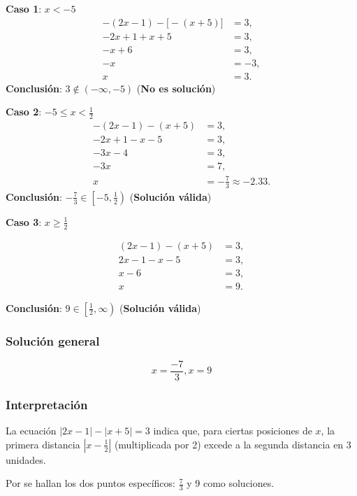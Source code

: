 \textbf{Caso 1}: \(x < -5\)
\begin{align*}
    -(2x-1) - \big[-(x+5)\big] &= 3,\\[1mm]
    -2x+1 + x+5 &= 3,\\[1mm]
    -x+6 &= 3,\\[1mm]
    -x &= -3,\\[1mm]
    x &= 3.
\end{align*}
\textbf{Conclusión}: \(3 \notin (-\infty,-5)\) \quad (\textbf{No es solución})

\textbf{Caso 2}: \(-5 \leq x < \frac{1}{2}\)
\begin{align*}
    -(2x-1) - (x+5) &= 3,\\[1mm]
    -2x+1 - x-5 &= 3,\\[1mm]
    -3x-4 &= 3,\\[1mm]
    -3x &= 7,\\[1mm]
    x &= -\frac{7}{3} \approx -2.33.
\end{align*}
\textbf{Conclusión}: \(-\frac{7}{3} \in \left[-5, \frac{1}{2}\right)\) \quad (\textbf{Solución válida})

\textbf{Caso 3}: \(x \geq \frac{1}{2}\)

\begin{align*}
    (2x-1) - (x+5) &= 3,\\[1mm]
    2x-1 - x-5 &= 3,\\[1mm]
    x-6 &= 3,\\[1mm]
    x &= 9.
\end{align*}

\textbf{Conclusión}: \(9 \in \left[\frac{1}{2}, \infty\right)\) \quad (\textbf{Solución válida})\\
\subsubsection*{Solución general}
\begin{equation*}
    x = \frac{-7}{3} , x = 9
\end{equation*}

\subsubsection*{Interpretación}

La ecuación \(|2x - 1| - |x + 5| = 3\) indica que, para ciertas posiciones de \(x\), la primera distancia $|x-\frac{1}{2}|$ (multiplicada por 2) excede a la segunda distancia en 3 unidades.

Por se hallan los dos puntos específicos: \(\frac{7}{3}\) y $9$ como soluciones.

